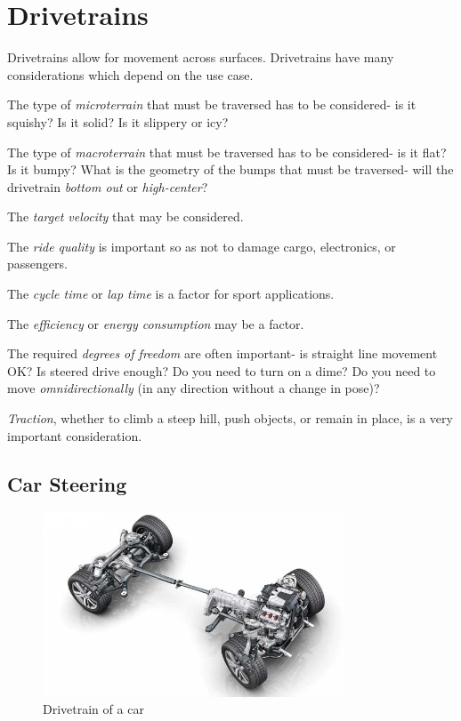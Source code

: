 \documentclass[10pt,letterpaper]{book}
\begin{document}
\section{Drivetrains} \label{section:drivetrains}
Drivetrains allow for movement across surfaces. Drivetrains have many considerations which depend on the use case.
\begin{asparaenum}[a)]
\item The type of \textit{microterrain} that must be traversed has to be considered- is it squishy? Is it solid? Is it slippery or icy? 
\item The type of \textit{macroterrain} that must be traversed has to be considered- is it flat? Is it bumpy? What is the geometry of the bumps that must be traversed- will the drivetrain \textit{bottom out} or \textit{high-center}?
\item The \textit{target velocity} that may be considered.
\item The \textit{ride quality} is important so as not to damage cargo, electronics, or passengers.
\item The \textit{cycle time} or \textit{lap time} is a factor for sport applications.
\item The \textit{efficiency} or \textit{energy consumption} may be a factor.
\item The required \textit{degrees of freedom} are often important- is straight line movement OK? Is steered drive enough? Do you need to turn on a dime? Do you need to move \textit{omnidirectionally} (in any direction without a change in pose)?
\item \textit{Traction}, whether to climb a steep hill, push objects, or remain in place, is a very important consideration.
\end{asparaenum}
\subsection{Car Steering}
\begin{figure}[H]
	\includegraphics[width=0.8\textwidth]{imgs/drivetrain_car.jpeg}
	\caption{Drivetrain of a car}
\end{figure}
\end{document}
